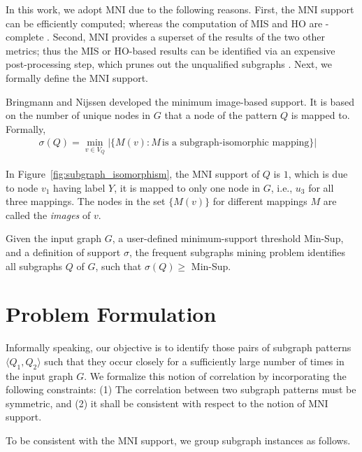 In this work, we adopt MNI  \cite{BN08}
due to the following reasons. First, the MNI support
can be efficiently computed; whereas the computation of MIS and HO are \NP-complete \cite{KK04,FB07}.
Second, MNI provides a superset of the results of the two other metrics; thus
the MIS or HO-based results can be identified via an expensive post-processing step,
which prunes out the unqualified subgraphs \cite{EASK14}.
Next, we formally define the MNI support.

 Bringmann and Nijssen \cite{BN08} developed the
minimum image-based support. It is based on the number of unique nodes in $G$ that a node of the pattern $Q$
is mapped to. Formally,
%
\begin{align}
\displaystyle \sigma(Q) = \min_{v \in V_Q} |\{M(v) : M \,\text{is a subgraph-isomorphic mapping}\}| &
\end{align}

In Figure~\ref{fig:subgraph_isomorphism}, the MNI support of $Q$ is $1$, which is due to
node $v_1$ having label $Y$, it is mapped to only one node in $G$, i.e., $u_3$ for all three
mappings. The nodes in the set $\{M(v)\}$ for different mappings $M$ are called the {\em images} of $v$.

 Given the input graph $G$, a user-defined minimum-support threshold {\sf Min-Sup}, and
a definition of support $\sigma$, the frequent subgraphs mining problem identifies all subgraphs $Q$ of $G$, such that
$\sigma(Q)\ge$ {\sf Min-Sup}.

\section{Problem Formulation}
\label{sec:problem}

Informally speaking, our objective is to identify those pairs of subgraph patterns $\langle Q_1, Q_2\rangle$ such that
they occur closely for a sufficiently large number of times in the input graph $G$. We formalize this notion of
correlation by incorporating the following constraints: (1) The correlation between two subgraph patterns must be
symmetric, and (2) it shall be consistent with respect to the notion of MNI support. 

To be consistent with the MNI support, we group subgraph instances as follows.

